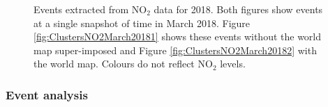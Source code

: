 \documentclass[11pt]{article}
\begin{document}
	
	\begin{figure}[H]
		\centering
		\caption{\footnotesize Events extracted from $\text{NO}_2$ data for 2018. Both figures show events at a single snapshot of time in March 2018. Figure \ref{fig:ClustersNO2March20181} shows these events without the world map super-imposed and Figure \ref{fig:ClustersNO2March20182}  with the world map. Colours do not reflect $\text{NO}_2$ levels.}
		\label{fig:ClustersNO2March2018}
	\end{figure}
	

	
	\subsubsection{Event analysis}
	
\end{document}
